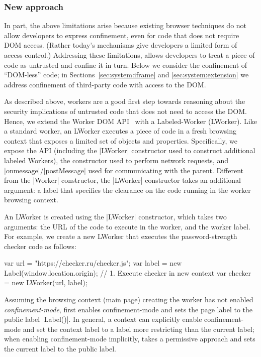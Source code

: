\subsubsection{New approach}
%
In part, the above limitations arise because existing browser
techniques do not allow developers to express confinement, even for
code that does not require DOM access.
%
(Rather today's mechanisms give developers a limited form of access
control.)
%
Addressing these limitations, \sys{} allows developers to treat a
piece of code as untrusted and confine it in turn.
%
Below we consider the confinement of ``DOM-less'' code; in
Sections~\ref{sec:system:iframe} and \ref{sec:system:extension} we
address confinement of third-party code with access to the DOM.

As described above, workers are a good first step towards reasoning
about the security implications of untrusted code that does not need
to access the DOM.
%
Hence, we extend the Worker DOM API~ with a
Labeled-Worker (LWorker).
%
Like a standard worker, an LWorker executes a piece of code in a fresh
browsing context that exposes a limited set of objects and properties.
%
Specifically, we expose the \sys{} API (including the \js|LWorker|
constructor used to construct additional labeled Workers), the \xhr{}
constructor used to perform network requests, and
\js|onmessage|/\js|postMessage| used for communicating with the
parent.
%
Different from the \js|Worker| constructor, the \js|LWorker|
constructor takes an additional argument: a label that specifies the
clearance on the code running in the worker browsing context.

An LWorker is created using the \js|LWorker| constructor, which takes
two arguments: the URL of the code to execute in the worker, and the
worker label.
%
For example, we create a new LWorker that executes the
password-strength checker code as follows:
\begin{jscode}
var url = "https://checker.ru/checker.js";
var label = new Label(window.location.origin);
// 1. Execute checker in new context
var checker = new LWorker(url, label);
\end{jscode}
%
Assuming the browsing context (main page) creating the worker has not
enabled \emph{confinement-mode}, \sys{} first enables confinement-mode
and sets the page label to the public label \js|Label()|.
%
In general, a context can explicitly enable confinement-mode and set
the context label to a label more restricting than the current label;
when enabling confinement-mode implicitly, \sys{} takes a permissive
approach and sets the current label to the public label.
 
